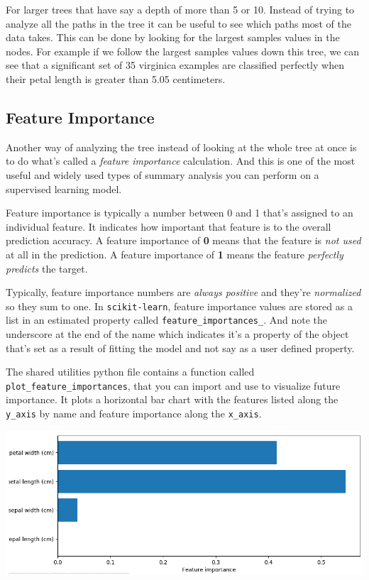 \begin{multicols}{2}
For larger trees that have say a depth of more than 5 or 10. Instead of trying to analyze all the paths in the tree it can be useful to see which paths most of the data takes. This can be done by looking for the largest samples values in the nodes. For example if we follow the largest samples values down this tree, we can see that a significant set of 35 virginica examples are classified perfectly when their petal length is greater than 5.05 centimeters. 

\subsection{Feature Importance}

Another way of analyzing the tree instead of looking at the whole tree at once is to do what's called a \emph{feature importance} calculation. And this is one of the most useful and widely used types of summary analysis you can perform on a supervised learning model. 

Feature importance is typically a number between 0 and 1 that's assigned to an individual feature. It indicates how important that feature is to the overall prediction accuracy. A feature importance of \textbf{0} means that the feature is \emph{not used} at all in the prediction. A feature importance of \textbf{1} means the feature \emph{perfectly predicts} the target. 

Typically, feature importance numbers are \emph{always positive }and they're \emph{normalized} so they sum to one. In \texttt{scikit-learn}, feature importance values are stored as a list in an estimated property called \texttt{feature_importances_}. And note the underscore at the end of the name which indicates it's a property of the object that's set as a result of fitting the model and not say as a user defined property. 

The shared utilities python file contains a function called \texttt{plot_feature_importances}, that you can import and use to visualize future importance. It plots a horizontal bar chart with the features listed along the \texttt{y_axis} by name and feature importance along the \texttt{x_axis}. 

\begin{center}
	\includegraphics[width=\linewidth]{img/Decision-Tree-Feature-Importance.png} 
\end{center}


\end{multicols}
